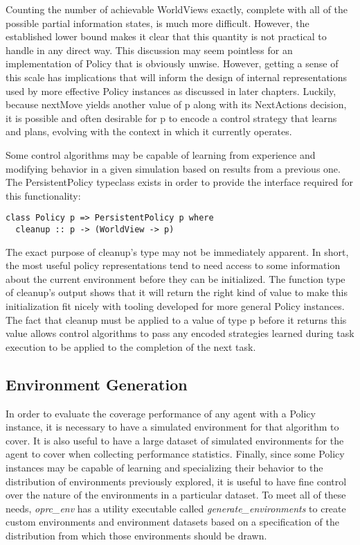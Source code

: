 Counting the number of achievable WorldViews exactly, complete with all of the possible partial information states, is much more difficult. However, the established lower bound makes it clear that this quantity is not practical to handle in any direct way. This discussion may seem pointless for an implementation of Policy that is obviously unwise. However, getting a sense of this scale has implications that will inform the design of internal representations used by more effective Policy instances as discussed in later chapters. Luckily, because nextMove yields another value of p along with its NextActions decision, it is possible and often desirable for p to encode a control strategy that learns and plans, evolving with the context in which it currently operates.

Some control algorithms may be capable of learning from experience and modifying behavior in a given simulation based on results from a previous one. The PersistentPolicy typeclass exists in order to provide the interface required for this functionality:

\begin{verbatim}
class Policy p => PersistentPolicy p where
  cleanup :: p -> (WorldView -> p)
\end{verbatim}

The exact purpose of cleanup's type may not be immediately apparent. In short, the most useful policy representations tend to need access to some information about the current environment before they can be initialized. The function type of cleanup's output shows that it will return the right kind of value to make this initialization fit nicely with tooling developed for more general Policy instances. The fact that cleanup must be applied to a value of type p before it returns this value allows control algorithms to pass any encoded strategies learned during task execution to be applied to the completion of the next task. 


\subsection{Environment Generation}

In order to evaluate the coverage performance of any agent with a Policy instance, it is necessary to have a simulated environment for that algorithm to cover. It is also useful to have a large dataset of simulated environments for the agent to cover when collecting performance statistics. Finally, since some Policy instances may be capable of learning and specializing their behavior to the distribution of environments previously explored, it is useful to have fine control over the nature of the environments in a particular dataset. To meet all of these needs, \textit{oprc\_env} has a utility executable called \textit{generate\_environments} to create custom environments and environment datasets based on a specification of the distribution from which those environments should be drawn.

